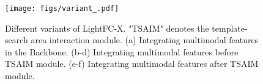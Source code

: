 \begin{figure}[t]
\centering
\texttt{[image: figs/variant\_.pdf]}
\caption{Different variants of LightFC-X. "TSAIM" denotes the template-search area interaction module. (a) Integrating multimodal features in the Backbone. (b-d) Integrating multimodal features before TSAIM module. (e-f) Integrating multimodal features after TSAIM module.}
\label{fig:variant}
\end{figure}
